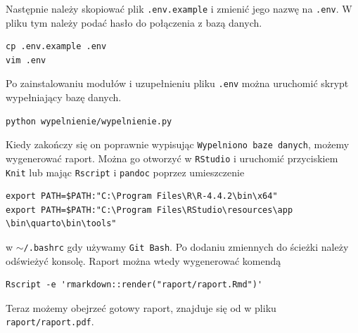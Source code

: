 \documentclass[a4paper,12pt]{mwart}
\begin{document}
Następnie należy skopiować plik \texttt{.env.example} i zmienić jego nazwę na \texttt{.env}. W pliku tym należy podać hasło do połączenia z bazą danych.

\begin{verbatim}
cp .env.example .env
vim .env
\end{verbatim}

Po zainstalowaniu modułów i uzupełnieniu pliku \texttt{.env} można uruchomić skrypt wypełniający bazę danych.

\begin{verbatim}
python wypelnienie/wypelnienie.py
\end{verbatim}

Kiedy zakończy się on poprawnie wypisując \texttt{Wypelniono baze danych}, możemy wygenerować raport. Można go otworzyć w \texttt{RStudio} i uruchomić przyciskiem \texttt{Knit} lub mając \texttt{Rscript} i \texttt{pandoc} poprzez umieszczenie 

\begin{verbatim}
export PATH=$PATH:"C:\Program Files\R\R-4.4.2\bin\x64"
export PATH=$PATH:"C:\Program Files\RStudio\resources\app
\bin\quarto\bin\tools"
\end{verbatim}

\noindent w \texttt{$\sim$/.bashrc} gdy używamy \texttt{Git Bash}. Po dodaniu zmiennych do ścieżki należy odświeżyć konsolę. Raport można wtedy wygenerować komendą

\begin{verbatim}
Rscript -e 'rmarkdown::render("raport/raport.Rmd")'
\end{verbatim}

Teraz możemy obejrzeć gotowy raport, znajduje się od w pliku \newline \texttt{raport/raport.pdf}.
\end{document}

